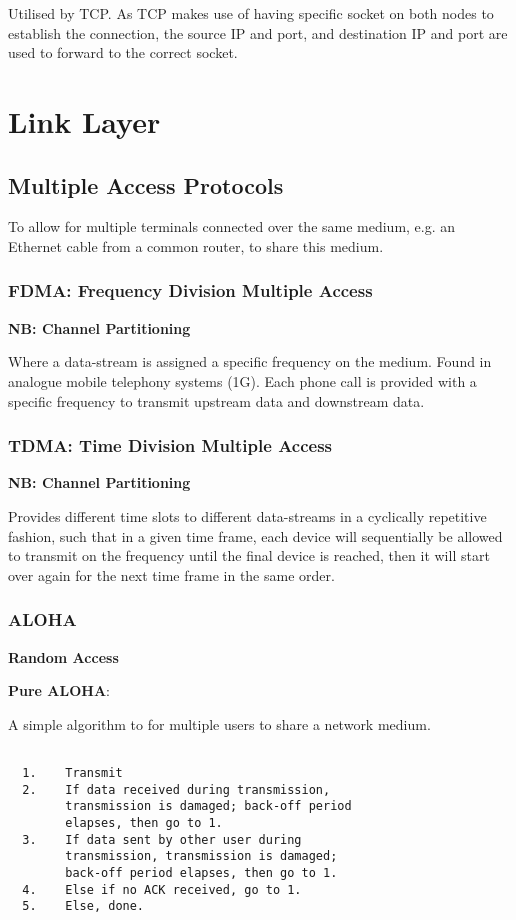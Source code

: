 \documentclass{article}
\begin{document}
Utilised by TCP. As TCP makes use of having specific socket on both nodes to establish the connection, the source IP and port, and destination IP and port are used to forward to the correct socket.

\newpage
\section{Link Layer}

\subsection{Multiple Access Protocols}

To allow for multiple terminals connected over the same medium, e.g. an Ethernet cable from a common router, to share this medium.

\subsubsection{FDMA: Frequency Division Multiple Access}

\textbf{NB: Channel Partitioning}

Where a data-stream is assigned a specific frequency on the medium. Found in analogue mobile telephony systems (1G). Each phone call is provided with a specific frequency to transmit upstream data and downstream data.

\subsubsection{TDMA: Time Division Multiple Access}

\textbf{NB: Channel Partitioning}

Provides different time slots to different data-streams in a cyclically repetitive fashion, such that in a given time frame, each device will sequentially be allowed to transmit on the frequency until the final device is reached, then it will start over again for the next time frame in the same order.
\filbreak
\subsubsection{ALOHA}

\textbf{Random Access}

\textbf{Pure ALOHA}:

A simple algorithm to for multiple users to share a network medium.

\begin{lstlisting}

  1.    Transmit
  2.    If data received during transmission, 
        transmission is damaged; back-off period
        elapses, then go to 1.
  3.    If data sent by other user during
        transmission, transmission is damaged;
        back-off period elapses, then go to 1.
  4.    Else if no ACK received, go to 1.
  5.    Else, done.

\end{lstlisting}
\end{document}
